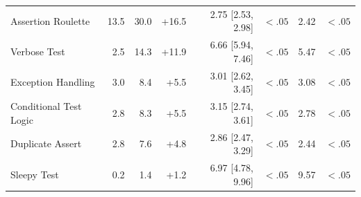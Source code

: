 \begin{tabular}{lrrrrrrr}
\midrule
Assertion Roulette & 13.5 & 30.0 & +16.5 & 2.75 [2.53, 2.98] & $<.05$ & 2.42 & $<.05$ \\
Verbose Test & 2.5 & 14.3 & +11.9 & 6.66 [5.94, 7.46] & $<.05$ & 5.47 & $<.05$ \\
Exception Handling & 3.0 & 8.4 & +5.5 & 3.01 [2.62, 3.45] & $<.05$ & 3.08 & $<.05$ \\
Conditional Test Logic & 2.8 & 8.3 & +5.5 & 3.15 [2.74, 3.61] & $<.05$ & 2.78 & $<.05$ \\
Duplicate Assert & 2.8 & 7.6 & +4.8 & 2.86 [2.47, 3.29] & $<.05$ & 2.44 & $<.05$ \\
Sleepy Test & 0.2 & 1.4 & +1.2 & 6.97 [4.78, 9.96] & $<.05$ & 9.57 & $<.05$ \\
\bottomrule
\end{tabular}
